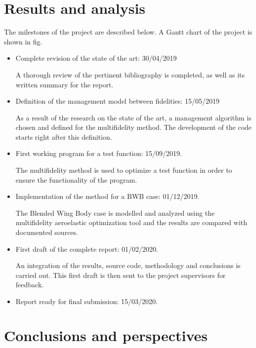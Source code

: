 \section{Results and analysis}
\label{sec:milestones}
The milestones of the project are described below. A Gantt chart of the project is shown in fig.
\begin{itemize}
    \item Complete revision of the state of the art: 30/04/2019
    
    A thorough review of the pertinent bibliography is completed, as well as its written summary for the report.
    \item Definition of the management model between fidelities: 15/05/2019
    
    As a result of the research on the state of the art, a management algorithm is chosen and defined for the multifidelity method. The development of the code starts right after this definition.
    \item First working program for a test function: 15/09/2019.
    
    The multifidelity method is used to optimize a test function in order to ensure the functionality of the program. 
    \item Implementation of the method for a BWB case: 01/12/2019.
    
    The Blended Wing Body case is modelled and analyzed using the multifidelity aeroelastic optimization tool and the results are compared with documented sources.
    \item First draft of the complete report: 01/02/2020.
    
    An integration of the results, source code, methodology and conclusions is carried out. This first draft is then sent to the project supervisors for feedback.
    \item Report ready for final submission: 15/03/2020.
\end{itemize}

\section{Conclusions and perspectives}
\label{sec:conclusions}
